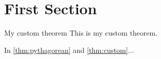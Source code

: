 \documentclass[dvipdfmx]{article}
\begin{document}
\section{First Section}


\begin{mytheo}{My custom theorem}
This is my custom theorem.
\end{mytheo}\label{thm:custom}

In \cref{thm:pythagorean} and \cref{thm:custom}...
\end{document}
